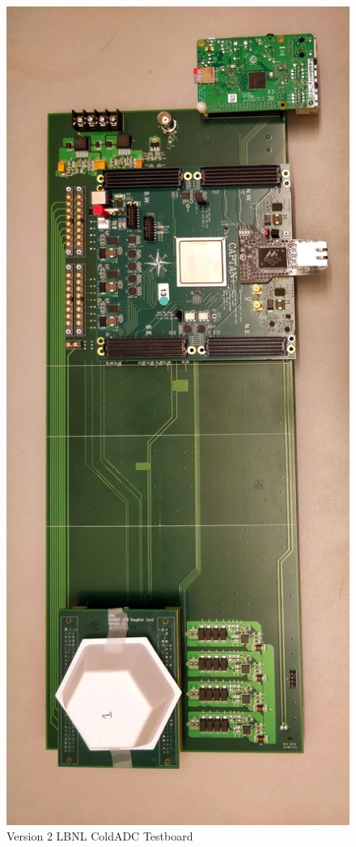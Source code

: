 \begin{figure}[h!]
\centering
  \includegraphics[width=0.3\linewidth]{figures/prakash_fig/v2_board.jpeg}
  \caption[LBNL ColdADC Testboard]{Version 2 LBNL ColdADC Testboard}
  \label{fig:v2_board}
\end{figure}


